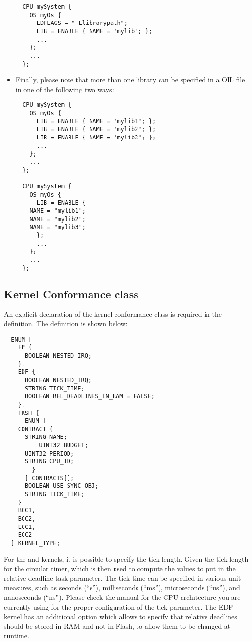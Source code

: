 \begin{itemize}
\begin{lstlisting}
  CPU mySystem {
    OS myOs {
      LDFLAGS = "-Llibrarypath";
      LIB = ENABLE { NAME = "mylib"; };
      ...
    };
    ...
  };
\end{lstlisting}

\item
  Finally, please note that more than one library can be specified in
  a OIL file in one of the following two ways:
\begin{lstlisting}
  CPU mySystem {
    OS myOs {
      LIB = ENABLE { NAME = "mylib1"; };
      LIB = ENABLE { NAME = "mylib2"; };
      LIB = ENABLE { NAME = "mylib3"; };
      ...
    };
    ...
  };

  CPU mySystem {
    OS myOs {
      LIB = ENABLE {
	NAME = "mylib1"; 
	NAME = "mylib2"; 
	NAME = "mylib3"; 
      };
      ...
    };
    ...
  };
\end{lstlisting}

\end{itemize}


\subsection{Kernel Conformance class}

An explicit declaration of the kernel conformance class is required in
the  definition. The definition is shown below:

\begin{lstlisting}
  ENUM [
    FP {
      BOOLEAN NESTED_IRQ;
    },
    EDF {
      BOOLEAN NESTED_IRQ;
      STRING TICK_TIME; 
      BOOLEAN REL_DEADLINES_IN_RAM = FALSE;
    },
    FRSH {
      ENUM [
	CONTRACT {
	  STRING NAME;
          UINT32 BUDGET;
	  UINT32 PERIOD;
	  STRING CPU_ID;
        }
      ] CONTRACTS[];
      BOOLEAN USE_SYNC_OBJ;
      STRING TICK_TIME;
    },
    BCC1,
    BCC2,
    ECC1,
    ECC2
  ] KERNEL_TYPE;
\end{lstlisting}

For the  and  kernels, it is possible to
specify the tick length. Given the tick length for the circular timer,
which is then used to compute the values to put in the relative
deadline task parameter. The tick time can be specified in various
unit measures, such as seconds (``s''), milliseconds (``ms''),
microseconds (``us''), and nanoseconds (``ns''). Please check the
manual for the CPU architecture you are currently using for the proper
configuration of the tick parameter. The EDF kernel has an additional
option which allows to specify that relative deadlines should be
stored in RAM and not in Flash, to allow them to be changed at
runtime.

